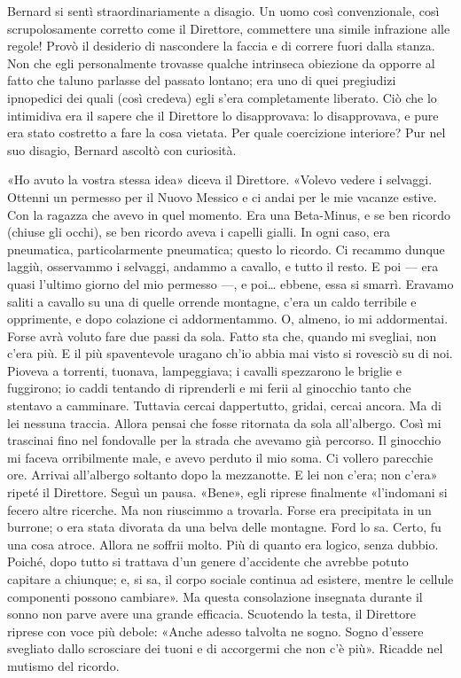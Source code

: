 \documentclass[
a5paper, %
10pt, %
twoside, 
onecolumn, %
openany, %
]{memoir}
\begin{document}
Bernard si sentì straordinariamente a disagio. Un uomo così convenzionale, così scrupolosamente corretto come il Direttore, commettere una simile infrazione alle regole! Provò il desiderio di nascondere la faccia e di correre fuori dalla stanza. Non che egli personalmente trovasse qualche intrinseca obiezione da opporre al fatto che taluno parlasse del passato lontano; era uno di quei pregiudizi ipnopedici dei quali (così credeva) egli s’era completamente liberato. Ciò che lo intimidiva era il sapere che il Direttore lo disapprovava: lo disapprovava, e pure era stato costretto a fare la cosa vietata. Per quale coercizione interiore? Pur nel suo disagio, Bernard ascoltò con curiosità.

«Ho avuto la vostra stessa idea» diceva il Direttore. «Volevo vedere i selvaggi. Ottenni un permesso per il Nuovo Messico e ci andai per le mie vacanze estive. Con la ragazza che avevo in quel momento. Era una Beta-Minus, e se ben ricordo (chiuse gli occhi), se ben ricordo aveva i capelli gialli. In ogni caso, era pneumatica, particolarmente pneumatica; questo lo ricordo. Ci recammo dunque laggiù, osservammo i selvaggi, andammo a cavallo, e tutto il resto. E poi — era quasi l’ultimo giorno del mio permesso —, e poi… ebbene, essa si smarrì. Eravamo saliti a cavallo su una di quelle orrende montagne, c’era un caldo terribile e opprimente, e dopo colazione ci addormentammo. O, almeno, io mi addormentai. Forse avrà voluto fare due passi da sola. Fatto sta che, quando mi svegliai, non c’era più. E il più spaventevole uragano ch’io abbia mai visto si rovesciò su di noi. Pioveva a torrenti, tuonava, lampeggiava; i cavalli spezzarono le briglie e fuggirono; io caddi tentando di riprenderli e mi ferii al ginocchio tanto che stentavo a camminare. Tuttavia cercai dappertutto, gridai, cercai ancora. Ma di lei nessuna traccia. Allora pensai che fosse ritornata da sola all’albergo. Così mi trascinai fino nel fondovalle per la strada che avevamo già percorso. Il ginocchio mi faceva orribilmente male, e avevo perduto il mio soma. Ci vollero parecchie ore. Arrivai all’albergo soltanto dopo la mezzanotte. E lei non c’era; non c’era» ripeté il Direttore. Seguì un pausa. «Bene», egli riprese finalmente «l’indomani si fecero altre ricerche. Ma non riuscimmo a trovarla. Forse era precipitata in un burrone; o era stata divorata da una belva delle montagne. Ford lo sa. Certo, fu una cosa atroce. Allora ne soffrii molto. Più di quanto era logico, senza dubbio. Poiché, dopo tutto si trattava d’un genere d’accidente che avrebbe potuto capitare a chiunque; e, si sa, il corpo sociale continua ad esistere, mentre le cellule componenti possono cambiare». Ma questa consolazione insegnata durante il sonno non parve avere una grande efficacia. Scuotendo la testa, il Direttore riprese con voce più debole: «Anche adesso talvolta ne sogno. Sogno d’essere svegliato dallo scrosciare dei tuoni e di accorgermi che non c’è più». Ricadde nel mutismo del ricordo.
\end{document}
